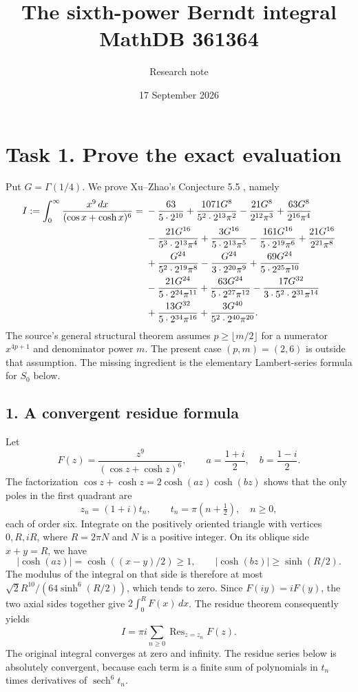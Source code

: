 \documentclass[11pt]{article}
\title{The sixth-power Berndt integral\\MathDB 361364}
\author{Research note}
\date{17 September 2026}
\newcommand{\sech}{\operatorname{sech}}
\newcommand{\Res}{\operatorname{Res}}
\begin{document}
\maketitle

\section*{Task 1. Prove the exact evaluation}
Put $G=\Gamma(1/4)$. We prove Xu--Zhao's Conjecture 5.5
\cite[p.~24]{XZ}, namely
\begin{align}
 I:=\int_0^\infty\frac{x^9\,dx}{(\cos x+\cosh x)^6}
 ={}&-\frac{63}{5\cdot2^{10}}
 +\frac{1071G^8}{5^2\cdot2^{13}\pi^2}
 -\frac{21G^8}{2^{12}\pi^3}
 +\frac{63G^8}{2^{16}\pi^4}\notag\\
 &-\frac{21G^{16}}{5^3\cdot2^{13}\pi^4}
 +\frac{3G^{16}}{5\cdot2^{13}\pi^5}
 -\frac{161G^{16}}{5\cdot2^{19}\pi^6}
 +\frac{21G^{16}}{2^{21}\pi^8}\notag\\
 &+\frac{G^{24}}{5^2\cdot2^{19}\pi^8}
 -\frac{G^{24}}{3\cdot2^{20}\pi^9}
 +\frac{69G^{24}}{5\cdot2^{25}\pi^{10}}\notag\\
 &-\frac{21G^{24}}{5\cdot2^{24}\pi^{11}}
 +\frac{63G^{24}}{5\cdot2^{27}\pi^{12}}
 -\frac{17G^{32}}{3\cdot5^2\cdot2^{31}\pi^{14}}\notag\\
 &+\frac{13G^{32}}{5\cdot2^{34}\pi^{16}}
 +\frac{3G^{40}}{5^2\cdot2^{40}\pi^{20}}.\label{target}
\end{align}
The source's general structural theorem assumes $p\ge\lfloor m/2\rfloor$
for a numerator $x^{4p+1}$ and denominator power $m$. The present
case $(p,m)=(2,6)$ is outside that assumption. The missing ingredient
is the elementary Lambert-series formula for $S_0$ below.

\subsection*{1. A convergent residue formula}
Let
\[
 F(z)=\frac{z^9}{(\cos z+\cosh z)^6},\qquad
 a=\frac{1+i}{2},\quad b=\frac{1-i}{2}.
\]
The factorization $\cos z+\cosh z=2\cosh(az)\cosh(bz)$ shows
that the only poles in the first quadrant are
\[
 z_n=(1+i)t_n,\qquad t_n=\pi(n+\tfrac12),\quad n\ge0,
\]
each of order six. Integrate on the positively oriented triangle
with vertices $0,R,iR$, where $R=2\pi N$ and $N$ is a positive integer.
On its oblique side $x+y=R$, we have
\[
 |\cosh(az)|=\cosh((x-y)/2)\ge1,\qquad
 |\cosh(bz)|\ge\sinh(R/2).
\]
The modulus of the integral on that side is therefore at most
$\sqrt2R^{10}/(64\sinh^6(R/2))$, which tends to zero.
Since $F(iy)=iF(y)$, the two axial sides together give
$2\int_0^R F(x)\,dx$. The residue theorem consequently yields
\begin{equation}\label{residue-sum}
 I=\pi i\sum_{n\ge0}\Res_{z=z_n}F(z).
\end{equation}
The original integral converges at zero and infinity. The residue
series below is absolutely convergent, because each term is a finite
sum of polynomials in $t_n$ times derivatives of $\sech^6t_n$.
\end{document}
